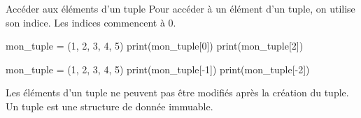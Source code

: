 \begin{easybox}{Accéder aux éléments d'un tuple}{}
	Pour accéder à un élément d'un tuple, on utilise son indice. Les indices commencent à 0.

	\smallskip

	\begin{minipage}{0.48\linewidth}
		\begin{ConsolePythontex}[Label=false]{}
mon_tuple = (1, 2, 3, 4, 5)
print(mon_tuple[0]) 
print(mon_tuple[2]) 
		\end{ConsolePythontex}
	\end{minipage}\hfill
	\begin{minipage}{0.48\linewidth}
		\begin{ConsolePythontex}[Label=false]{}
mon_tuple = (1, 2, 3, 4, 5)
print(mon_tuple[-1]) 
print(mon_tuple[-2])
		\end{ConsolePythontex}
	\end{minipage}
	\end{easybox}	

	\begin{propriete}{}
		Les éléments d'un tuple ne peuvent pas être modifiés après la création du tuple. Un tuple est une structure de donnée immuable.

	\end{propriete}

